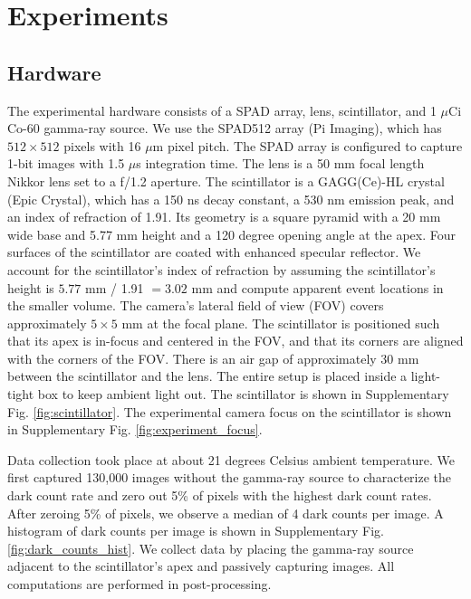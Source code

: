\section{Experiments} \label{sec:experiments}

\subsection{Hardware}

The experimental hardware consists of a SPAD array, lens, scintillator, and 1 $\mu$Ci Co-60 gamma-ray source.
We use the SPAD512 array (Pi Imaging), which has $512 \times 512$ pixels with 
16 $\mu$m pixel pitch.
The SPAD array is configured to capture 1-bit images with 1.5 $\mu$s 
integration time.
The lens is a 50 mm focal length Nikkor lens set to a f/1.2 aperture.
The scintillator is a GAGG(Ce)-HL crystal (Epic Crystal), which has a 150 ns decay 
constant, a 530 nm emission peak, and an index of refraction of 1.91.
Its geometry is a square pyramid with a 20 mm wide base and 5.77 mm 
height and a 120 degree opening angle at the apex.
Four surfaces of the scintillator are coated with enhanced specular reflector.
We account for the scintillator's index of refraction by assuming the 
scintillator's height is $5.77$ mm  / 1.91 $=3.02$ mm and compute apparent event 
locations in the smaller volume.
The camera's lateral field of view (FOV) covers approximately $5 \times 5$ mm at 
the focal plane.
The scintillator is positioned such that its apex is in-focus and centered in the 
FOV, and that its corners are aligned with the corners of the FOV. 
There is an air gap of approximately 30 mm between the scintillator and the lens.
The entire setup is placed inside a light-tight box to keep ambient light out.
The scintillator is shown in Supplementary Fig. \ref*{fig:scintillator}.
The experimental camera focus on the scintillator is shown in Supplementary Fig. \ref*{fig:experiment_focus}. 

Data collection took place at about 21 degrees Celsius ambient temperature.
We first captured 130,000 images without the gamma-ray source to characterize the 
dark count rate and zero out 5\% of pixels with the highest dark count rates.
After zeroing 5\% of pixels, we observe a median of 4 dark counts per image.
A histogram of dark counts per image is shown in Supplementary Fig. \ref*{fig:dark_counts_hist}.
We collect data by placing the gamma-ray source adjacent to the scintillator's 
apex and passively capturing images.
All computations are performed in post-processing.


